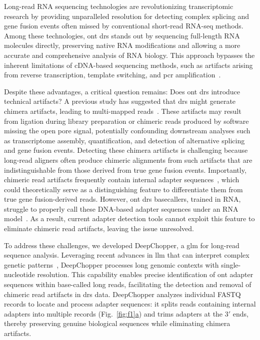 \documentclass[pdflatex,sn-nature, lineno]{sn-jnl}%
\newcommand{\figref}[2]{Fig.~\hyperref[#1]{\ref*{#1}#2}}
\begin{document}
Long-read RNA sequencing technologies are revolutionizing transcriptomic research by providing unparalleled resolution for detecting complex splicing and gene fusion events often missed by conventional short-read RNA-seq methods.
Among these technologies, \gls{ont} \gls{drs} stands out by sequencing full-length RNA molecules directly, preserving native RNA modifications and allowing a more accurate and comprehensive analysis of RNA biology.
This approach bypasses the inherent limitations of cDNA-based sequencing methods, such as artifacts arising from reverse transcription, template switching, and \gls{pcr} amplification~\cite{garalde2018highly, jain2022advances}.

Despite these advantages, a critical question remains: Does \gls{ont} \gls{drs} introduce technical artifacts?
A previous study has suggested that \gls{drs} might generate chimera artifacts, leading to multi-mapped reads~\cite{smith2020molecular}.
These artifacts may result from ligation during library preparation or chimeric reads produced by software missing the open pore signal, potentially confounding downstream analyses such as transcriptome assembly, quantification, and detection of alternative splicing and gene fusion events.
Detecting these chimera artifacts is challenging because long-read aligners often produce chimeric alignments from such artifacts that are indistinguishable from those derived from true gene fusion events.
Importantly, chimeric read artifacts frequently contain internal adapter sequences~\cite{smith2020molecular}, which could theoretically serve as a distinguishing feature to differentiate them from true gene fusion-derived reads.
However, \gls{ont} \gls{drs} basecallers, trained in RNA, struggle to properly call these DNA-based adapter sequences under an RNA model~\cite{liu2024sequencing}.
As a result, current adapter detection tools cannot exploit this feature to eliminate chimeric read artifacts, leaving the issue unresolved.

To address these challenges, we developed DeepChopper, a \gls{glm} for long-read sequence analysis.
Leveraging recent advances in \gls{llm} that can interpret complex genetic patterns~\cite{benegas2024genomic}, DeepChopper processes long genomic contexts with single-nucleotide resolution.
This capability enables precise identification of \gls{ont} adapter sequences within base-called long reads, facilitating the detection and removal of chimeric read artifacts in \gls{drs} data. DeepChopper analyzes individual FASTQ records to locate and process adapter sequences: it splits reads containing internal adapters into multiple records (\figref{fig:f1}{a}) and trims adapters at the $3'$ ends, thereby preserving genuine biological sequences while eliminating chimera artifacts.
\end{document}
